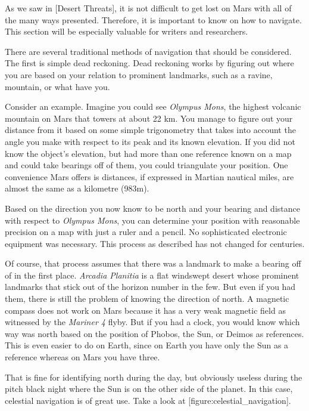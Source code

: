 

As we saw in [Desert Threats], it is not difficult to get lost on Mars with all of the many ways presented. Therefore, it is important to know on how to navigate. This section will be especially valuable for writers and researchers.

There are several traditional methods of navigation that should be considered. The first is simple dead reckoning. Dead reckoning works by figuring out where you are based on your relation to prominent landmarks, such as a ravine, mountain, or what have you. 

Consider an example. Imagine you could see {\it Olympus Mons}, the highest volcanic mountain on Mars that towers at about 22 km. You manage to figure out your distance from it based on some simple trigonometry that takes into account the angle you make with respect to its peak and its known elevation. If you did not know the object's elevation, but had more than one reference known on a map and could take bearings off of them, you could triangulate your position. One convenience Mars offers is distances, if expressed in Martian nautical miles, are almost the same as a kilometre (983m).

Based on the direction you now know to be north and your bearing and distance with respect to {\it Olympus Mons}, you can determine your position with reasonable precision on a map with just a ruler and a pencil. No sophisticated electronic equipment was necessary. This process as described has not changed for centuries.

Of course, that process assumes that there was a landmark to make a bearing off of in the first place. {\it Arcadia Planitia} is a flat windswept desert whose prominent landmarks that stick out of the horizon number in the few. But even if you had them, there is still the problem of knowing the direction of north. A magnetic compass does not work on Mars because it has a very weak magnetic field as witnessed by the {\it Mariner 4} flyby. But if you had a clock, you would know which way was north based on the position of Phobos, the Sun, or Deimos as references. This is even easier to do on Earth, since on Earth you have only the Sun as a reference whereas on Mars you have three.

That is fine for identifying north during the day, but obviously useless during the pitch black night where the Sun is on the other side of the planet. In this case, celestial navigation is of great use. Take a look at [figure:celestial_navigation].

